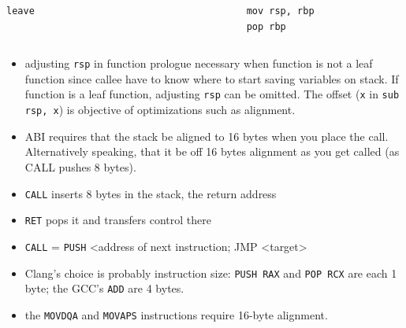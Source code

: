 \documentclass[compress,aspectratio=1610]{beamer}
\begin{document}
\begin{frame}
    \centering
    \begin{columns}
        \begin{column}{.3\textwidth}
            \begin{lstlisting}[language={}]
leave
            \end{lstlisting}
        \end{column}
        \begin{column}{.2\textwidth}
            \centering
            \scalebox{2.}{$\Leftrightarrow$}
        \end{column}
        \begin{column}{.3\textwidth}
            \begin{lstlisting}[language={}]
mov rsp, rbp
pop rbp
            \end{lstlisting}
        \end{column}
    \end{columns}
\end{frame}

\begin{frame}[plain]
    \begin{itemize}
        \item adjusting \texttt{rsp} in function prologue necessary when function is not a leaf function since callee have to know where to start saving variables on stack. If function is a leaf function, adjusting \texttt{rsp} can be omitted. The offset (\texttt{x} in \texttt{sub rsp, x}) is objective of optimizations such as alignment.
        \item ABI requires that the stack be aligned to 16 bytes when you place the call. Alternatively speaking, that it be off 16 bytes alignment as you get called (as CALL pushes 8 bytes).
        \item \texttt{CALL} inserts 8 bytes in the stack, the return address
        \item \texttt{RET} pops it and transfers control there
        \item \texttt{CALL} = \texttt{PUSH} <address of next instruction; JMP <target>
        \item Clang's choice is probably instruction size: \texttt{PUSH RAX} and \texttt{POP RCX} are each 1 byte; the GCC's \texttt{ADD} are 4 bytes.
        \item the \texttt{MOVDQA} and \texttt{MOVAPS} instructions require 16-byte alignment.
    \end{itemize}
\end{frame}
\end{document}

